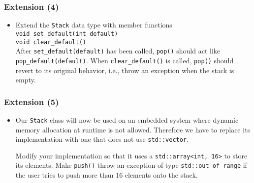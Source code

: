 \documentclass[10pt,aspectratio=169]{beamer}
\begin{document}
\begin{frame}[fragile]
  \frametitle{Extension (4)}  
  \begin{itemize}
  \item Extend the \texttt{Stack} data type with member functions\\[1ex]
    \verb!void set_default(int default)!\\
    \verb!void clear_default()!\\[1ex]
    After \verb!set_default(default)! has been called, \texttt{pop()}
    should act like \verb!pop_default(default)!. When
    \verb!clear_default()! is called, \texttt{pop()} should revert to
    its original behavior, i.e., throw an exception when the stack is
    empty.
  \end{itemize}
\end{frame}

\begin{frame}[fragile]
  \frametitle{Extension (5)}
  \begin{itemize}
  \item Our \texttt{Stack} class will now be used on an embedded
    system where dynamic memory allocation at runtime is not allowed.
    Therefore we have to replace its implementation with one that does
    not use \verb!std::vector!.

    Modify your implementation so that it uses a
    \verb|std::array<int, 16>| to store its elements. Make
    \texttt{push()} throw an exception of type
    \verb!std::out_of_range! if the user tries to push more than 16
    elements onto the stack.
  \end{itemize}
\end{frame}

\end{document}
